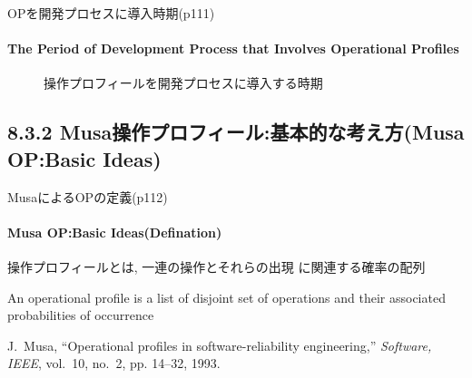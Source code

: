 \begin{frame}{OPを開発プロセスに導入時期(p111)}
\framesubtitle{The Period of Development Process that Involves Operational Profiles}
\begin{figure}
\begin{center}
\begin{overprint}
 \begin{center}\end{center}
 \begin{center}\end{center}
 \begin{center}\end{center}
\end{overprint}
\caption{操作プロフィールを開発プロセスに導入する時期}
\end{center}
\end{figure}
\end{frame}
\subsection{8.3.2 Musa操作プロフィール:基本的な考え方(Musa OP:Basic Ideas)}
\begin{frame}[shrink=10]{MusaによるOPの定義(p112)}
\framesubtitle{Musa OP:Basic Ideas(Defination)}
\begin{definationfc}[操作プロフィール]
操作プロフィールとは, 一連の操作とそれらの出現
に関連する確率の配列 

An operational profile is a list of disjoint set of operations
and their associated probabilities of occurrence

\end{definationfc}

\begin{thebibliography}{Musa(1993)}

J.~Musa, ``Operational profiles in software-reliability engineering,''
  \emph{Software, IEEE}, vol.~10, no.~2, pp. 14--32, 1993.

\end{thebibliography}


\end{frame}

